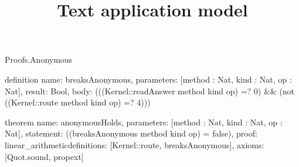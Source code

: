 \begin{lexlean}{Proofs.Anonymous}
\title{Text application model}
\begin{semanticmodule}
definition{
  name: breaksAnonymous,
  parameters: [method : Nat, kind : Nat, op : Nat],
  result: Bool,
  body: (((Kernel::readAnswer method kind op) =? 0) && (not ((Kernel::route method kind op) =? 4)))
}

theorem{
  name: anonymousHolds,
  parameters: [method : Nat, kind : Nat, op : Nat],
  statement: ((breaksAnonymous method kind op) = false),
  proof: linear_arithmetic{definitions: [Kernel::route, breaksAnonymous]},
  axioms: [Quot.sound, propext]
}
\end{semanticmodule}
\end{lexlean}
